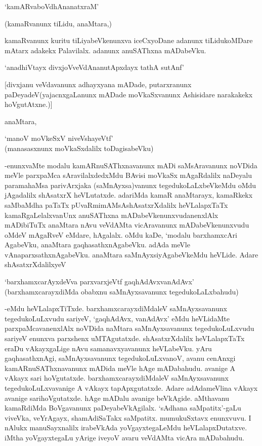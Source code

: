 \begin{shloka}
`kamARvaboVdhAnanatxraM'
\end{shloka}

(kamaRvanunx tiLidu, anaMtara,)

kamaRvanunx kuritu tiLiyabeVkenunxva iceCxyoDane adanunx tiLidukoMDare mAtarx adakekx Palavilalx. adanunx anuSAThxna mADabeVku.

\begin{shloka}
`anadhiVtayx divxjoVveVdAnanutApxdayx tathA sutAnf'
\end{shloka}

[divxjanu veVdavanunx adhayxyana mADade, putarxranunx paDeyadeV(yajacnxgaLanunx mADade moVkaSxvanunx Ashisidare narakakekx hoVgutAtxne.)]

anaMtara,

\begin{shloka}
`manoV moVkeSxV niveVshayeVtf'\\
(manasasxnunx moVkaSxdalilx toDagisabeVku)
\end{shloka}

-enunxvaMte modalu kamARnuSAThxnavanunx mADi saMsAravanunx noVDida meVle parxpaMca sAravilalxdedxMdu BAvisi moVkaSx mAgaRdalilx naDeyalu paramahaMsa parivArxjaka (saMnAyxsa)vanunx tegedukoLaLxbeVkeMdu oMdu jAgadalilx shAsatxrX heVLutatxde. adariMda kamaR anaMtarayx, kamaRkekx saMbaMdha paTaTx pUvaRmimAMsAshAsatxrXdalilx heVLalapxTaTx kamaRgaLelalxvanUnx anuSAThxna mADabeVkenunxvudanenxlAlx mADibiTuTx anaMtara nAvu veVdAMta vicAravanunx mADabeVkenunxvudu oMdeV mAgaRveV eMdare, hAgalalx. oMdu kaDe, `modalu barxhamxcAri AgabeVku, anaMtara gaqhasathxnAgabeVku. adAda meVle vAnaparxsathxnAgabeVku. anaMtara saMnAyxsiyAgabeVkeMdu heVLide. Adare shAsatxrXdalilxyeV

\begin{shloka}
`barxhamxcarAyxdeVva parxvarxjeVtf gaqhAdAvxvanAdAvx'\\
(barxhamxcarayxdiMda obabxnu saMnAyxsavanunx tegedukoLaLxbahudu)
\end{shloka} 

-eMdu heVLalapxTiTxde. barxhamxcarayxdiMdaleV saMnAyxsavanunx tegedukoLuLxvudu sariyeV, `gaqhAdAvx, vanAdAvx' eMdu heVLidaMte parxpaMcavanenxlAlx noVDida naMtara saMnAyxsavanunx tegedukoLuLxvudu sariyeV enunxva parxshenx uMTAgutatxde. shAsatxrXdalilx heVLalapxTaTx eraDu vAkayxgaLige nAvu samanavxyavanunx heVLabeVku. yAru gaqhasathxnAgi, saMnAyxsavanunx tegedukoLuLxvanoV, avanu cenAnxgi kamARnuSAThxnavanunx mADida meVle hAge mADabahudu. avanige A vAkayx sari hoVgutatxde. barxhamxcarayxdiMdaleV saMnAyxsavanunx tegedukoLuLxvavanige A vAkayx tapApxgutatxde. Adare adAdameVlina vAkayx avanige sarihoVgutatxde. hAge mADalu avanige beVkAgide. aMthavanu kamaRdiMda BoVgavanunx paDeyabeVkAgilalx. `sAdhana saMpatitx'-gaLu viveVka, veYrAgayx, shamAdiSaTakx saMpatitx. mumukuSxtavx enunxvuvu. I nAlukx manuSayxnalilx irabeVkAda yoVgayxtegaLeMdu heVLalapxDutatxve. iMtha yoVgayxtegaLu yArige iveyoV avaru veVdAMta vicAra mADabahudu.

